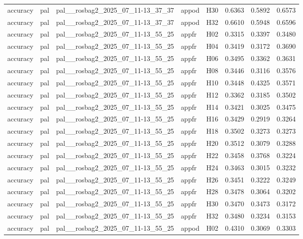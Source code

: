 \begin{table}[tbp]
\begin{tabular}{lllllrrr}
accuracy & pal & pal\_\_rosbag2\_2025\_07\_11-13\_37\_37 & appod & H30 & 0.6363 & 0.5892 & 0.6573 \\
accuracy & pal & pal\_\_rosbag2\_2025\_07\_11-13\_37\_37 & appod & H32 & 0.6610 & 0.5948 & 0.6596 \\
accuracy & pal & pal\_\_rosbag2\_2025\_07\_11-13\_55\_25 & appfr & H02 & 0.3315 & 0.3397 & 0.3480 \\
accuracy & pal & pal\_\_rosbag2\_2025\_07\_11-13\_55\_25 & appfr & H04 & 0.3419 & 0.3172 & 0.3690 \\
accuracy & pal & pal\_\_rosbag2\_2025\_07\_11-13\_55\_25 & appfr & H06 & 0.3495 & 0.3362 & 0.3631 \\
accuracy & pal & pal\_\_rosbag2\_2025\_07\_11-13\_55\_25 & appfr & H08 & 0.3446 & 0.3116 & 0.3576 \\
accuracy & pal & pal\_\_rosbag2\_2025\_07\_11-13\_55\_25 & appfr & H10 & 0.3448 & 0.4325 & 0.3571 \\
accuracy & pal & pal\_\_rosbag2\_2025\_07\_11-13\_55\_25 & appfr & H12 & 0.3362 & 0.3185 & 0.3502 \\
accuracy & pal & pal\_\_rosbag2\_2025\_07\_11-13\_55\_25 & appfr & H14 & 0.3421 & 0.3025 & 0.3475 \\
accuracy & pal & pal\_\_rosbag2\_2025\_07\_11-13\_55\_25 & appfr & H16 & 0.3429 & 0.2919 & 0.3264 \\
accuracy & pal & pal\_\_rosbag2\_2025\_07\_11-13\_55\_25 & appfr & H18 & 0.3502 & 0.3273 & 0.3273 \\
accuracy & pal & pal\_\_rosbag2\_2025\_07\_11-13\_55\_25 & appfr & H20 & 0.3512 & 0.3079 & 0.3288 \\
accuracy & pal & pal\_\_rosbag2\_2025\_07\_11-13\_55\_25 & appfr & H22 & 0.3458 & 0.3768 & 0.3224 \\
accuracy & pal & pal\_\_rosbag2\_2025\_07\_11-13\_55\_25 & appfr & H24 & 0.3463 & 0.3015 & 0.3232 \\
accuracy & pal & pal\_\_rosbag2\_2025\_07\_11-13\_55\_25 & appfr & H26 & 0.3451 & 0.3222 & 0.3249 \\
accuracy & pal & pal\_\_rosbag2\_2025\_07\_11-13\_55\_25 & appfr & H28 & 0.3478 & 0.3064 & 0.3202 \\
accuracy & pal & pal\_\_rosbag2\_2025\_07\_11-13\_55\_25 & appfr & H30 & 0.3470 & 0.3473 & 0.3172 \\
accuracy & pal & pal\_\_rosbag2\_2025\_07\_11-13\_55\_25 & appfr & H32 & 0.3480 & 0.3234 & 0.3153 \\
accuracy & pal & pal\_\_rosbag2\_2025\_07\_11-13\_55\_25 & appod & H02 & 0.4310 & 0.3069 & 0.3303 \\

\end{tabular}
\end{table}
